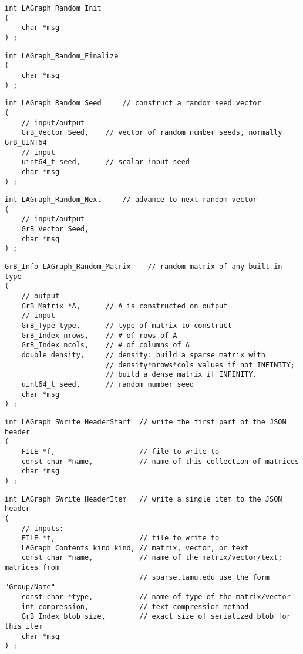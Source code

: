 \begin{verbatim}
int LAGraph_Random_Init
(
    char *msg
) ;
\end{verbatim}




\begin{verbatim}
int LAGraph_Random_Finalize
(
    char *msg
) ;
\end{verbatim}




\begin{verbatim}
int LAGraph_Random_Seed     // construct a random seed vector
(
    // input/output
    GrB_Vector Seed,    // vector of random number seeds, normally GrB_UINT64
    // input
    uint64_t seed,      // scalar input seed
    char *msg
) ;
\end{verbatim}




\begin{verbatim}
int LAGraph_Random_Next     // advance to next random vector
(
    // input/output
    GrB_Vector Seed,
    char *msg
) ;
\end{verbatim}




\begin{verbatim}
GrB_Info LAGraph_Random_Matrix    // random matrix of any built-in type
(
    // output
    GrB_Matrix *A,      // A is constructed on output
    // input
    GrB_Type type,      // type of matrix to construct
    GrB_Index nrows,    // # of rows of A
    GrB_Index ncols,    // # of columns of A
    double density,     // density: build a sparse matrix with
                        // density*nrows*cols values if not INFINITY;
                        // build a dense matrix if INFINITY.
    uint64_t seed,      // random number seed
    char *msg
) ;
\end{verbatim}




\begin{verbatim}
int LAGraph_SWrite_HeaderStart  // write the first part of the JSON header
(
    FILE *f,                    // file to write to
    const char *name,           // name of this collection of matrices
    char *msg
) ;
\end{verbatim}




\begin{verbatim}
int LAGraph_SWrite_HeaderItem   // write a single item to the JSON header
(
    // inputs:
    FILE *f,                    // file to write to
    LAGraph_Contents_kind kind, // matrix, vector, or text
    const char *name,           // name of the matrix/vector/text; matrices from
                                // sparse.tamu.edu use the form "Group/Name"
    const char *type,           // name of type of the matrix/vector
    int compression,            // text compression method
    GrB_Index blob_size,        // exact size of serialized blob for this item
    char *msg
) ;
\end{verbatim}




